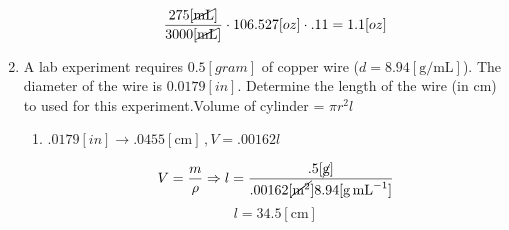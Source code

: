 \documentclass[12pt]{article}
\begin{document}
\begin{enumerate}
\begin{enumerate}
        $$\frac{275[\cancel{\si{\milli\liter}}]}{3000[\cancel{\si{\milli\liter}}]}\cdot106.527[oz]\cdot.11=1.1[oz]$$

    \end{enumerate}

  \item A lab experiment requires $0.5[\si{gram}]$ of copper wire ($d = 8.94[\si{\gram\per\milli\liter}]$). The diameter of the wire is $0.0179[in]$. Determine the length of the wire (in $\si{\centi\meter}$) to used for this experiment.Volume of cylinder = $\pi r^2 l$ 

    \begin{enumerate}

      \item $.0179[in]\rightarrow.0455[\si{\centi\meter}]\,, V=.00162l$

        $$V=\frac{m}{\rho}\Rightarrow l=\frac{.5[\cancel{\si{\gram}}]}{.00162[\cancel{\si{\meter\squared}}]8.94[\si{\gram\per\milli\liter}]}$$
        $$l=34.5[\si{\centi\meter}]$$

    \end{enumerate}

\end{enumerate}
\end{document}
